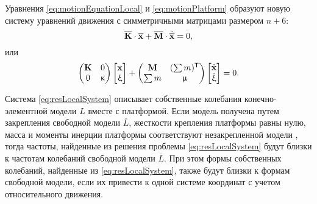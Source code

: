 Уравнения \eqref{eq:motionEquationLocal} и \eqref{eq:motionPlatform} образуют новую систему уравнений движения с симметричными матрицами размером $ n + 6 $:
\begin{equation}
	\overline{\mathbf{K}} \cdot \overline{\mathbf{x}} + \overline{\mathbf{M}} \cdot \ddot{\overline{\mathbf{x}}} = 0,
\end{equation}
или
\begin{equation}
	\begin{pmatrix}
	\mathbf{K} & 0 \\
	0 & \upkappa
	\end{pmatrix}
	\begin{bmatrix}
	\mathbf{x} \\
	\upxi
	\end{bmatrix}
	+
	\begin{pmatrix}
	\mathbf{M} & (\sum m) ^ \mathsf{T} \\
	\sum m & \upmu
	\end{pmatrix}
	\begin{bmatrix}
	\ddot{\mathbf{x}} \\
	\ddot{\upxi}
	\end{bmatrix} = 0.
	\label{eq:resLocalSystem}
\end{equation}

Система \eqref{eq:resLocalSystem} описывает собственные колебания конечно-элементной модели $ L $ вместе с платформой. Если модель  получена путем закрепления свободной модели $ \overline{L} $, жесткости крепления платформы равны нулю, масса и моменты инерции платформы соответствуют незакрепленной модели , тогда частоты, найденные из решения проблемы \eqref{eq:resLocalSystem}  будут близки к частотам  колебаний свободной модели $ \overline{L} $. При этом формы собственных колебаний, найденные из \eqref{eq:resLocalSystem}, также будут близки к формам свободной модели, если их привести к одной системе координат с учетом относительного движения.


